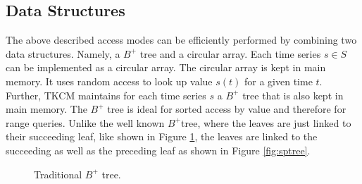 \documentclass[abstracton,12pt]{scrreprt}
\begin{document}
\subsection{Data Structures}
The above described access modes can be efficiently performed by combining two data structures. Namely, a $B^+$ tree and a circular array. Each time series $s \in S$ can be implemented as a circular array. The circular array is kept in main memory. It uses random access to look up value $s(t)$ for a given time $t$. Further, TKCM maintains for each time series $s$ a $B^+$ tree that is also kept in main memory. The $B^+$ tree is ideal for sorted access by value and therefore for range queries. Unlike the well known $B^+$tree, where the leaves are just linked to their succeeding leaf, like shown in Figure \ref{fig:tratree}, the leaves are linked to the succeeding as well as the preceding leaf as shown in Figure \ref{fig:sptree}.

\begin{figure}[H]
		\centering

	\caption{Traditional $B^+$ tree.}
	\label{fig:tratree}
\end{figure}
\end{document}
